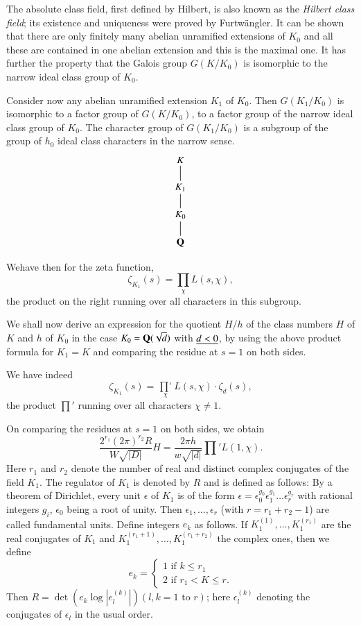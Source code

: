 The absolute class field, first defined by Hilbert, is also known as
the {\em Hilbert class field}; its existence and uniqueness were
proved by Furtw\"angler. It can be shown that there are only finitely
many abelian unramified extensions of $K_{0}$ and all these are
contained in one abelian extension and this is the maximal one. It has
further the property that the Galois group $G(K/K_{0})$ is isomorphic
to the narrow ideal class group of $K_{0}$.

Consider now any abelian unramified extension $K_{1}$ of $K_{0}$. Then
$G(K_{1}/K_{0})$ is isomorphic to a factor group of $G(K/K_{0})$, \ie
to a factor group of the narrow ideal class group of $K_{0}$. The
character group of $G(K_{1}/K_{0})$ is a subgroup of the group of
$h_{0}$ ideal class characters in the narrow sense.
\[
\xymatrix@R=.5cm{
K\ar@{-}[d]\\
K_{1}\ar@{-}[d]\\
K_{0}\ar@{-}[d]\\
\bQ
}
\]

We\pageoriginale have then for the zeta function,
$$
\zeta_{K_{1}}(s)=\prod_{\chi}L(s,\chi),
$$
the product on the right running over all characters in this subgroup.

We shall now derive an expression for the quotient $H/h$ of the class
numbers $H$ of $K$ and $h$ of $K_{0}$ in the case
$K_{0}=\mathbf{Q}(\sqrt{d})$ with $\underline{d<0}$, by using the above product
formula for $K_{1}=K$ and comparing the residue at $s=1$ on both
sides.

We have indeed
$$
\zeta_{K_{1}}(s)=\mathop{{\prod}'}\limits_{\chi}L(s,\chi)\cdot
\zeta_{d}(s),
$$
the product $\prod'$ running over all characters $\chi\neq 1$.

On comparing the residues at $s=1$ on both sides, we obtain
\begin{equation*}
\frac{2^{r_{1}}(2\pi)^{r_{2}}R}{W\sqrt{|D|}}H=\frac{2\pi
  h}{w\sqrt{|d|}}\prod'L(1,\chi).\tag{73}\label{73}
\end{equation*}
Here $r_{1}$ and $r_{2}$ denote the number of real and distinct
complex conjugates of the field $K_{1}$. The regulator of $K_{1}$ is
denoted by $R$ and is defined as follows: By a theorem of Dirichlet,
every unit $\epsilon$ of $K_{1}$ is of the form
$\epsilon=\epsilon^{g_{0}}_{0}\epsilon^{g_{1}}_{1}\ldots
\epsilon^{g_{r}}_{r}$ with rational integers $g_{i}$, $\epsilon_{0}$
being a root of unity. Then $\epsilon_{1},\ldots,\epsilon_{r}$ (with
$r=r_{1}+r_{2}-1$) are called fundamental units. Define integers
$e_{k}$ as follows. If $K^{(1)}_{1},\ldots,K^{(r_{1})}_{1}$ are the
real conjugates of $K_{1}$ and
$K_{1}^{(r_{1}+1)},\ldots,K_{1}^{(r_{1}+r_{2})}$ the complex ones,
then we define
$$
e_{k}=
\begin{cases}
1\text{ \ if \ } k\leq r_{1}\\
2\text{ \ if \ } r_{1}<K\leq r.
\end{cases}
$$
Then $R=\det(e_{k}\log|e^{(k)}_{l}|)(l,k=1\text{ \ to \ } r)$; here
$\epsilon^{(k)}_{l}$ denoting the conjugates of $\epsilon_{l}$ in the
usual order.

